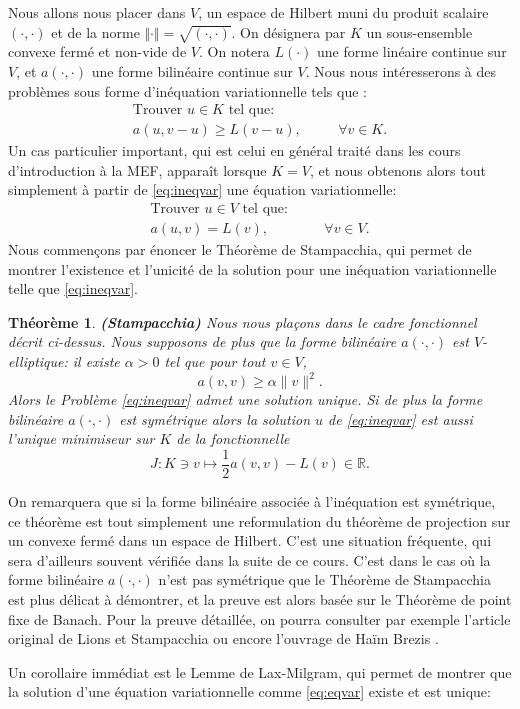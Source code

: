 \documentclass[11pt]{book}
\newtheorem{theorem}{Théorème}[section]
\newcommand{\beq}{\begin{eqnarray}}
\newcommand{\eeq}{\end{eqnarray}}
\newcommand{\bt}{\begin{theorem}}
\newcommand{\et}{\end{theorem}}
\newcommand{\R}{\mathbb{R}}
\begin{document}
Nous allons nous placer dans $V$, un espace de Hilbert muni du produit scalaire $(\cdot,\cdot)$ et de la norme 
$\Vert\cdot\Vert = \sqrt{(\cdot,\cdot)}$. On désignera par $K$ un sous-ensemble convexe fermé et non-vide de $V$. On notera $L(\cdot)$ une forme linéaire continue sur $V$, et $a(\cdot,\cdot)$ une forme bilinéaire continue sur $V$.
Nous nous intéresserons à des problèmes sous forme d'inéquation variationnelle tels que :
\beq
\mbox{Trouver }u \in K \mbox{ tel que:}\nonumber\\
a(u,v-u) \ge L(v-u),&& \quad \forall v \in K. \label{eq:ineqvar}
\eeq
Un cas particulier important, qui est celui en général traité dans les cours d'introduction à la MEF, apparaît lorsque $K=V$, et nous obtenons alors tout simplement à partir de \eqref{eq:ineqvar} une équation variationnelle:
\beq
\mbox{Trouver }u \in V \mbox{ tel que:}\nonumber\\
a(u,v) = L(v),&& \quad \forall v \in V. \label{eq:eqvar}
\eeq
Nous commençons par énoncer le Théorème de Stampacchia, qui permet de montrer l'existence et l'unicité de la solution pour une inéquation variationnelle telle que \eqref{eq:ineqvar}. 

\bt \label{thm:stampacchia} {\bf (Stampacchia)} Nous nous plaçons dans le cadre fonctionnel décrit ci-dessus. Nous supposons de plus que la forme bilinéaire $a(\cdot,\cdot)$ est $V$-elliptique: il existe $\alpha > 0$ tel que pour tout $v \in V$,
\[
a(v,v) \geq \alpha \| v \|^2.
\]
Alors le Problème \eqref{eq:ineqvar} admet une solution unique.
Si de plus la forme bilinéaire $a(\cdot,\cdot)$ est symétrique alors la solution $u$ de \eqref{eq:ineqvar} est aussi l'unique minimiseur sur $K$ de la fonctionnelle
\[
J : K\ni v \mapsto \frac12 a(v,v) - L(v) \in \R. 
\]
\et

On remarquera que si la forme bilinéaire associée à l'inéquation est symétrique, ce théorème est tout simplement une reformulation du théorème de projection sur un convexe fermé dans un espace de Hilbert. C'est une situation fréquente, qui sera d'ailleurs souvent vérifiée dans la suite de ce cours. C'est dans le cas où la forme bilinéaire $a(\cdot,\cdot)$ n'est pas symétrique que le Théorème de Stampacchia est plus délicat à démontrer, et la preuve est alors basée sur le Théorème de point fixe de Banach. Pour la preuve détaillée, on pourra consulter par exemple l'article original de Lions et Stampacchia \cite{lions-stampacchia-67} ou encore l'ouvrage de Ha\"im Brezis \cite[Th\'eor\`eme V.6]{brezis-83}.

Un corollaire immédiat est le Lemme de Lax-Milgram, qui permet de montrer que la solution d'une équation variationnelle comme \eqref{eq:eqvar} existe et est unique:
\end{document}
